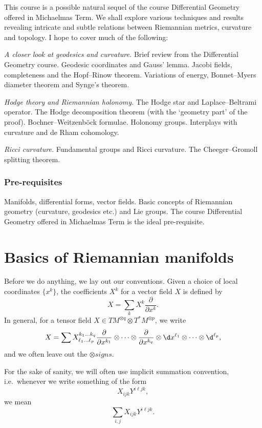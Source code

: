 \documentclass[a4paper]{article}
\begin{document}
\maketitle
{\small
\setlength{\parindent}{0em}
\setlength{\parskip}{1em}
This course is a possible natural sequel of the course Differential Geometry offered in Michaelmas Term. We shall explore various techniques and results revealing intricate and subtle relations between Riemannian metrics, curvature and topology. I hope to cover much of the following:

\emph{A closer look at geodesics and curvature.} Brief review from the Differential Geometry course. Geodesic coordinates and Gauss' lemma. Jacobi fields, completeness and the Hopf--Rinow theorem. Variations of energy, Bonnet--Myers diameter theorem and Synge's theorem.

\emph{Hodge theory and Riemannian holonomy.} The Hodge star and Laplace--Beltrami operator. The Hodge decomposition theorem (with the `geometry part' of the proof). Bochner--Weitzenb\"ock formulae. Holonomy groups. Interplays with curvature and de Rham cohomology.

\emph{Ricci curvature.} Fundamental groups and Ricci curvature. The Cheeger--Gromoll splitting theorem.

\subsubsection*{Pre-requisites}
Manifolds, differential forms, vector fields. Basic concepts of Riemannian geometry (curvature, geodesics etc.) and Lie groups. The course Differential Geometry offered in Michaelmas Term is the ideal pre-requisite.
}
\tableofcontents

\section{Basics of Riemannian manifolds}
Before we do anything, we lay out our conventions. Given a choice of local coordinates $\{x^k\}$, the coefficients $X^k$ for a vector field $X$ is defined by
\[
  X = \sum_k X^k \frac{\partial}{\partial x^k}.
\]
In general, for a tensor field $X \in TM^{\otimes q} \otimes T^*M^{\otimes p}$, we write
\[
  X = \sum X^{k_1 \ldots k_q}_{\ell_1 \ldots \ell_p} \frac{\partial}{\partial x^{k_1}} \otimes \cdots \otimes \frac{\partial}{\partial x^{k_q}} \otimes \d x^{\ell_1} \otimes \cdots \otimes \d^{\ell_p},
\]
and we often leave out the $\otimes signs$.

For the sake of sanity, we will often use implicit summation convention, i.e.\ whenever we write something of the form
\[
  X_{ijk} Y^{i\ell jk},
\]
we mean
\[
  \sum_{i, j} X_{ijk} Y^{i\ell jk}.
\]
\end{document}

